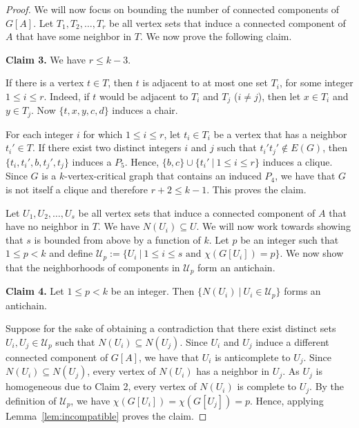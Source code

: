 \documentclass[10pt]{article}
\theoremstyle{definition}
\begin{document}
\begin{proof}
\bigskip

\noindent

We will now focus on bounding the number of connected components of $G[A]$. Let $T_1, T_2, \ldots, T_r$ be all vertex sets that induce a connected component of $A$ that have some neighbor in $T$. We now prove the following claim.


\noindent \textbf{Claim 3.} We have $r \leq k-3$.

\bigskip

If there is a vertex $t \in T$, then $t$ is adjacent to at most one set $T_i$, for some integer $1 \leq i \leq r$. Indeed, if $t$ would be adjacent to $T_i$ and $T_j$ ($i \neq j$), then let $x \in T_i$ and $y \in T_j$. Now $\{t,x,y,c,d\}$ induces a chair.

For each integer $i$ for which $1 \leq i \leq r$, let $t_i \in T_i$ be a vertex that has a neighbor $t_i'\in T$. If there exist two distinct integers $i$ and $j$ such that $t_i't_j' \notin E(G)$, then $\{t_i,t_i',b,t_j',t_j\}$ induces a $P_5$. Hence, $\{b,c\} \cup \{t_i'~|~1 \leq i \leq r\}$ induces a clique. Since $G$ is a $k$-vertex-critical graph that contains an induced $P_4$, we have that $G$ is not itself a clique and therefore $r+2 \leq k-1$. This proves the claim.

\bigskip

\noindent

Let $U_1, U_2, \ldots, U_s$ be all vertex sets that induce a connected component of $A$ that have no neighbor in $T$. We have $N(U_i) \subseteq U$. We will now work towards showing that $s$ is bounded from above by a function of $k$. Let $p$ be an integer such that $1 \leq p<k$ and define $\mathcal{U}_p := \{U_i ~|~ 1 \leq i \leq s\text{ and }\chi(G[U_i])=p\}$. We now show that the neighborhoods of components in $\mathcal{U}_p$ form an antichain.

\noindent \textbf{Claim 4.} Let $1 \leq p <k$ be an integer. Then $\{N(U_i)~|~U_i \in \mathcal{U}_p\}$ forms an antichain.

\bigskip

Suppose for the sake of obtaining a contradiction that there exist distinct sets $U_i, U_j \in \mathcal{U}_p$ such that $N(U_i) \subseteq N(U_j)$. Since $U_i$ and $U_j$ induce a different connected component of $G[A]$, we have that $U_i$ is anticomplete to $U_j$. Since $N(U_i)\subseteq N(U_j)$, every vertex of $N(U_i)$ has a neighbor in $U_j$. As $U_j$ is homogeneous due to Claim 2, every vertex of $N(U_i)$ is complete to $U_j$. By the definition of $\mathcal{U}_p$, we have $\chi(G[U_i])=\chi(G[U_j])=p$. Hence, applying Lemma~\ref{lem:incompatible} proves the claim.
\bigskip


\end{proof}
\end{document}
